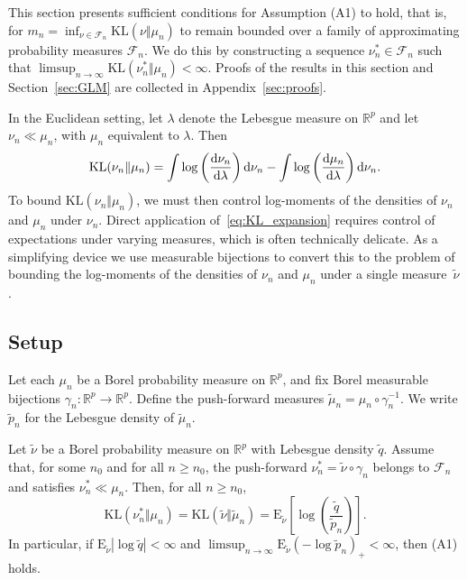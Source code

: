 \documentclass[11pt]{article}
\theoremstyle{plain}
\theoremstyle{definition}
\theoremstyle{remark}
\begin{document}
\label{sec:log-moments}

This section presents sufficient conditions for Assumption (A1) to hold, that is, for $m_{n}=\inf_{\nu\in\mathcal{F}_{n}}\mathrm{KL}(\nu\Vert\mu_{n})$
to remain bounded over a family of approximating probability measures
$\mathcal{F}_{n}$. We do this by constructing a sequence $\nu_{n}^{*}\in\mathcal{F}_{n}$
such that $\limsup_{n\to\infty}\mathrm{KL}(\nu_{n}^{*}\Vert\mu_{n})<\infty$. Proofs of the results in this section and Section~\ref{sec:GLM} are collected in Appendix~\ref{sec:proofs}.



In the Euclidean setting, let $\lambda$ denote the Lebesgue measure on
$\mathbb{R}^{p}$ and let $\nu_{n}\ll\mu_{n}$, with $\mu_n$ equivalent to $\lambda$.
Then
\begin{equation}
    \mathrm{KL}(\nu_{n}\Vert\mu_{n})=\int\log\left(\frac{{\rm d}\nu_{n}}{{\rm d}\lambda}\right){\rm d}\nu_{n}-\int\log\left(\frac{{\rm d}\mu_{n}}{{\rm d}\lambda}\right){\rm d}\nu_{n}. \label{eq:KL_expansion}
\end{equation}
To bound $\mathrm{KL}(\nu_{n}\Vert\mu_{n})$, we must then
control log-moments of the densities of $\nu_{n}$ and $\mu_{n}$
under $\nu_{n}$.
Direct application of~\eqref{eq:KL_expansion} requires control of expectations under varying measures, which is often technically delicate.
As a simplifying device we use measurable bijections to convert this to the problem of bounding the log-moments of the densities of $\nu_{n}$ and $\mu_{n}$ under a single measure~$\tilde\nu$.






\subsection{Setup}

Let each $\mu_{n}$ be a Borel probability measure on $\mathbb{R}^{p}$,
and fix Borel measurable bijections $\gamma_{n}:\mathbb{R}^{p}\to\mathbb{R}^{p}$.
Define the push-forward measures $\tilde\mu_n=\mu_{n}\circ\gamma_{n}^{-1}$.
We write $\tilde p_{n}$ for the Lebesgue density of $\tilde\mu_n$.



\begin{prop}
\label{prop:log-mom-oneQ} Let $\tilde\nu$ be a Borel probability measure on $\mathbb{R}^{p}$ with Lebesgue density $\tilde q$. Assume that, for some $n_{0}$ and for all $n\ge n_{0}$, the push-forward
$\nu_{n}^{*}=\tilde{\nu}\circ\gamma_{n}$ belongs to $\mathcal{F}_{n}$ and
satisfies $\nu_{n}^{*}\ll\mu_{n}$. Then, for
all $n\ge n_{0}$,
\[
\mathrm{KL}(\nu_{n}^{*}\Vert\mu_{n})=\mathrm{KL}(\tilde{\nu}\Vert\tilde{\mu}_{n})=\mathrm{E}_{\tilde{\nu}}\left[\log\left(\frac{\tilde{q}}{\tilde{p}_{n}}\right)\right].
\]
In particular, if $\mathrm{E}_{\tilde{\nu}}|\log \tilde{q}|<\infty$
and $\limsup_{n\to\infty}\mathrm{E}_{\tilde{\nu}}(-\log \tilde{p}_{n})_+<\infty$,
then (A1) holds.
\end{prop}
\end{document}
